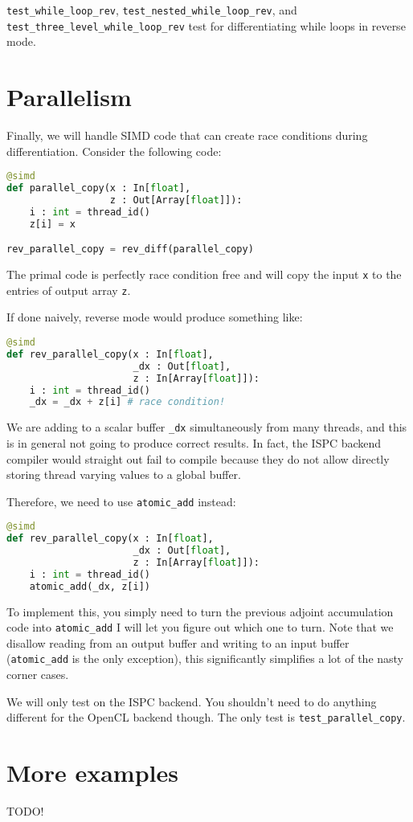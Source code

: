 \lstinline{test_while_loop_rev}, \lstinline{test_nested_while_loop_rev}, and \lstinline{test_three_level_while_loop_rev} test for differentiating while loops in reverse mode.

\section{Parallelism}
Finally, we will handle SIMD code that can create race conditions during differentiation. Consider the following code:
\begin{lstlisting}[language=python]
@simd
def parallel_copy(x : In[float],
                  z : Out[Array[float]]):
    i : int = thread_id()
    z[i] = x

rev_parallel_copy = rev_diff(parallel_copy)
\end{lstlisting}
The primal code is perfectly race condition free and will copy the input \lstinline{x} to the entries of output array \lstinline{z}.

If done naively, reverse mode would produce something like:
\begin{lstlisting}[language=python]
@simd
def rev_parallel_copy(x : In[float],
                      _dx : Out[float],
                      z : In[Array[float]]):
    i : int = thread_id()
    _dx = _dx + z[i] # race condition!
\end{lstlisting}
We are adding to a scalar buffer \lstinline{_dx} simultaneously from many threads, and this is in general not going to produce correct results. In fact, the ISPC backend compiler would straight out fail to compile because they do not allow directly storing thread varying values to a global buffer.

Therefore, we need to use \lstinline{atomic_add} instead:
\begin{lstlisting}[language=python]
@simd
def rev_parallel_copy(x : In[float],
                      _dx : Out[float],
                      z : In[Array[float]]):
    i : int = thread_id()
    atomic_add(_dx, z[i])
\end{lstlisting}

To implement this, you simply need to turn the previous adjoint accumulation code into \lstinline{atomic_add} I will let you figure out which one to turn. Note that we disallow reading from an output buffer and writing to an input buffer (\lstinline{atomic_add} is the only exception), this significantly simplifies a lot of the nasty corner cases.

We will only test on the ISPC backend. You shouldn't need to do anything different for the OpenCL backend though. The only test is \lstinline{test_parallel_copy}.

\section{More examples}
TODO!


